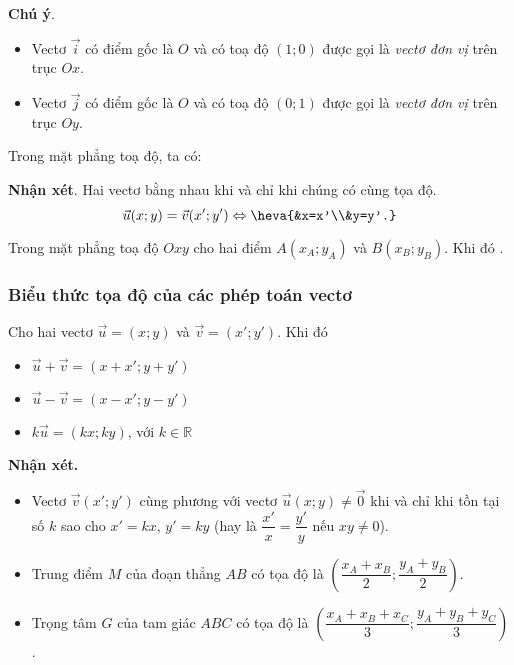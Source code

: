 \textbf{Chú ý}.
\begin{itemize}
	\item Vectơ $\vec{i}$ có điểm gốc là $O$ và có toạ độ $(1;0)$ được gọi là \textit{vectơ đơn vị} trên trục $Ox$.
	\item Vectơ $\vec{j}$ có điểm gốc là $O$ và có toạ độ $(0;1)$ được gọi là \textit{vectơ đơn vị} trên trục $Oy$.
\end{itemize}
\begin{dl}
	Trong mặt phẳng toạ độ, ta có:
	\begin{center}
	\end{center}
\end{dl}
\textbf{Nhận xét}. Hai vectơ bằng nhau khi và chỉ khi chúng có cùng tọa độ.
\[\vec{u}(x;y)=\vec{v}(x';y')\Leftrightarrow\heva{&x=x'\\&y=y'.} \]
\begin{dn}
	Trong mặt phẳng toạ độ $Oxy$ cho hai điểm $A(x_A;y_A)$ và $B(x_B;y_B)$. Khi đó .
\end{dn}
\subsubsection{Biểu thức tọa độ của các phép toán vectơ}
\begin{dl}
	Cho hai vectơ $\vec{u}=(x;y)$ và $\vec{v}=(x';y')$. Khi đó
	\begin{itemize}
		\item $\vec{u}+\vec{v}=(x+x';y+y')$
		\item $\vec{u}-\vec{v}=(x-x';y-y')$
		\item $k\vec{u}=(kx;ky)$, với $k\in\mathbb{R}$
	\end{itemize}
\end{dl}
\textbf{Nhận xét.}
\begin{itemize}
	\item Vectơ $\vec{v}(x';y')$ cùng phương với vectơ $\vec{u}(x;y)\neq \vec{0}$ khi và chỉ khi tồn tại số $k$ sao cho $x'=kx$, $y'=ky$ (hay là $\dfrac{x'}{x}=\dfrac{y'}{y}$ nếu $xy\neq 0$).
	\item Trung điểm $M$ của đoạn thẳng $AB$ có tọa độ là $\left(\dfrac{x_A+x_B}{2};\dfrac{y_A+y_B}{2}\right)$.
	\item Trọng tâm $G$ của tam giác $ABC$ có tọa độ là $\left(\dfrac{x_A+x_B+x_C}{3};\dfrac{y_A+y_B+y_C}{3}\right)$.
\end{itemize}
